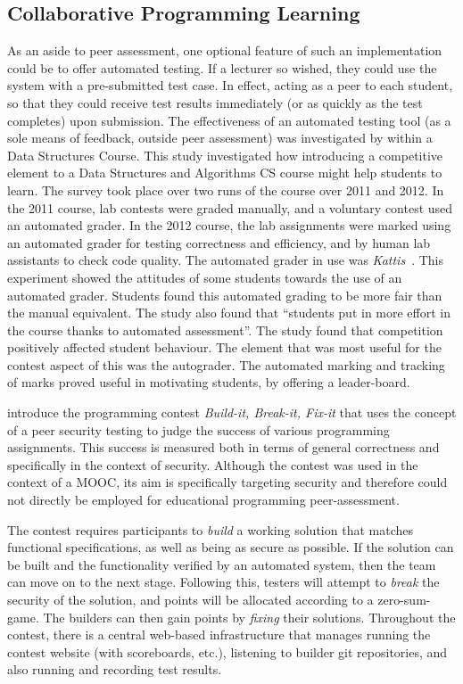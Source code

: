 \documentclass[sigplan,10pt,review]{acmart}\settopmatter{printfolios=true}
\begin{document}
\subsection{Collaborative Programming Learning}

As an aside to peer assessment, one optional feature of such an
implementation could be to offer automated testing. If a lecturer so
wished, they could use the system with a pre-submitted test case. In
effect, acting as a peer to each student, so that they could receive
test results immediately (or as quickly as the test completes) upon
submission.
%
The effectiveness of an automated testing tool (as a sole means of
feedback, outside peer assessment) was investigated by
\citet{farnqvist_competition_2016} within a Data Structures
Course.
%
This study investigated how introducing a competitive element to a
Data Structures and Algorithms \ac{CS} course might help students to
learn. The survey took place over two runs of the course over 2011 and
2012. In the 2011 course, lab contests were graded manually, and a
voluntary contest used an automated grader. In the 2012 course, the
lab assignments were marked using an automated grader for testing
correctness and efficiency, and by human lab assistants to check code
quality. The automated grader in use was
\textit{Kattis}~\cite{enstrom_five_2011}.
% 
This experiment showed the attitudes of some students towards the use
of an automated grader. Students found this automated grading to be
more fair than the manual equivalent. The study also found that
``students put in more effort in the course thanks to automated
assessment''.  The study found that competition positively affected
student behaviour. The element that was most useful for the contest
aspect of this was the autograder. The automated marking and tracking
of marks proved useful in motivating students, by offering a
leader-board.

\citet{Rue+Hic+Par+Lev+Mem+Pla+Mar_CCS-2016} introduce the programming
contest \emph{Build-it, Break-it, Fix-it} that uses the concept of a
peer security testing to judge the success of various programming
assignments. This success is measured both in terms of general
correctness and specifically in the context of security. Although the
contest was used in the context of a \ac{MOOC}, its aim is
specifically targeting security and therefore could not directly be
employed for educational programming peer-assessment.

The contest requires participants to \textit{build} a working solution
that matches functional specifications, as well as being as secure as
possible. If the solution can be built and the functionality verified
by an automated system, then the team can move on to the next
stage. Following this, testers will attempt to \textit{break} the
security of the solution, and points will be allocated according to a
zero-sum-game. The builders can then gain points by \textit{fixing}
their solutions.
Throughout the contest, there is a central web-based infrastructure
that manages running the contest website (with scoreboards, etc.),
listening to builder git repositories, and also running and recording
test results.
\end{document}
